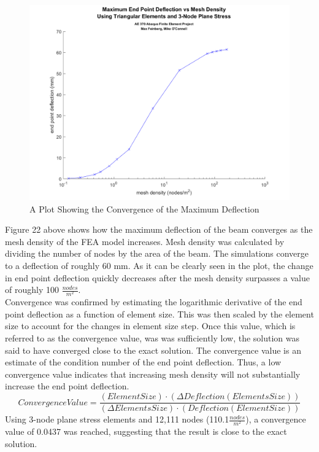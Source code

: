 \documentclass[a4paper]{article}
\begin{document}
\begin{figure}[ht]
\centering
\includegraphics[scale=.55]{ae370abaqus_3node.png}
\caption{A Plot Showing the Convergence of the Maximum Deflection}
\end{figure}
Figure 22 above shows how the maximum deflection of the beam converges as the mesh density of the FEA model increases. Mesh density was calculated by dividing the number of nodes by the area of the beam. The simulations converge to a deflection of roughly 60 mm.  As it can be clearly seen in the plot, the change in end point deflection quickly decreases after the mesh density surpasses a value of roughly 100 $\frac{nodes}{m^{2}}$.\\

Convergence was confirmed by estimating the logarithmic derivative of the end point deflection as a function of element size. This was then scaled by the element size to account for the changes in element size step.  Once this value, which is referred to as the convergence value, was was sufficiently low, the solution was said to have converged close to the exact solution.  The convergence value is an estimate of the condition number of the end point deflection.  Thus, a low convergence value indicates that increasing mesh density will not substantially increase the end point deflection.
$$
ConvergenceValue = \frac{(ElementSize) \cdot (\Delta Deflection(ElementsSize))}{(\Delta ElementsSize) \cdot (Deflection(ElementSize))}
$$
Using 3-node plane stress elements and 12,111 nodes (110.1$\frac{nodes}{m^{2}}$), a convergence value of 0.0437 was reached, suggesting that the result is close to the exact solution.\\
\end{document}
